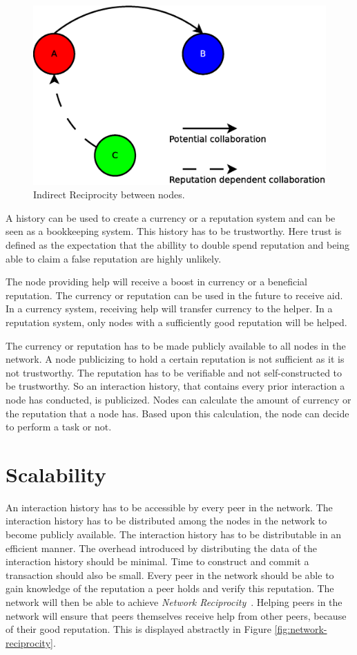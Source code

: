 \begin{figure}
	\centerline{\includegraphics[scale=0.3]{problemDescription/figs/indirect-reciprocity.eps}}
	\caption{Indirect Reciprocity between nodes.}
	\label{fig:indirect-reciprocity}
\end{figure}

A history can be used to create a currency or a reputation system
and can be seen as a bookkeeping system.
This history has to be trustworthy.
Here trust is defined as the expectation that the abillity to double spend reputation
and being able to claim a false reputation are highly unlikely.

The node providing help will receive a boost in currency or a beneficial reputation.
The currency or reputation can be used in the future to receive aid.
In a currency system, receiving help will transfer currency to the helper.
In a reputation system, only nodes with a sufficiently good reputation will be helped.

The currency or reputation has to be made publicly available to all nodes in the network.
A node publicizing to hold a certain reputation is not sufficient as it is not trustworthy.
The reputation has to be verifiable and not self-constructed to be trustworthy.
So an interaction history, that contains every prior interaction a node has conducted, is publicized.
Nodes can calculate the amount of currency or the reputation that a node has.
Based upon this calculation, the node can decide to perform a task or not.

\section{Scalability}
An interaction history has to be accessible by every peer in the network.
The interaction history has to be distributed among the nodes in the network
to become publicly available.
The interaction history has to be distributable in an efficient manner.
The overhead introduced by distributing the data of the interaction history should be minimal.
Time to construct and commit a transaction should also be small.
Every peer in the network should be able to gain knowledge of the reputation a peer holds and verify this reputation.
The network will then be able to achieve \emph{Network Reciprocity}~\cite{Nowak-Cooperation}.
Helping peers in the network will ensure that peers themselves receive help from other peers,
because of their good reputation.
This is displayed abstractly in Figure \ref{fig:network-reciprocity}.

